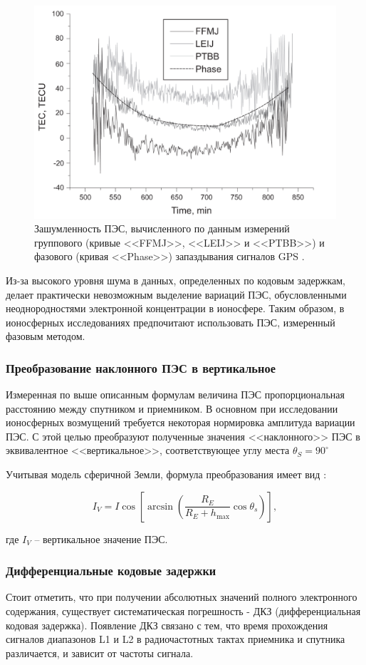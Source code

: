 \documentclass[14pt]{article}
\begin{document}
\begin{figure}[h]
\centering
\includegraphics[width = 0.6\linewidth]{pics/pic2.png}
\caption{Зашумленность ПЭС, вычисленного по данным измерений группового (кривые <<FFMJ>>, <<LEIJ>> и <<PTBB>>) и фазового (кривая <<Phase>>) запаздывания сигналов GPS \cite{kozharin}.}
\label{pic2}
\end{figure}

Из-за высокого уровня шума в данных, определенных по кодовым задержкам, делает практически невозможным выделение вариаций ПЭС, обусловленными неоднородностями электронной концентрации в ионосфере. Таким образом, в ионосферных исследованиях предпочитают использовать ПЭС, измеренный фазовым методом. 

\subsubsection{Преобразование наклонного ПЭС  в вертикальное}
Измеренная по выше описанным формулам величина ПЭС пропорциональная расстоянию между спутником и приемником. В основном при исследовании ионосферных возмущений требуется некоторая нормировка амплитуда вариации ПЭС. С этой целью преобразуют полученные значения <<наклонного>> ПЭС в эквивалентное <<вертикальное>>, соответствующее углу места $\theta_S = 90^{\circ}$ 

Учитывая модель сферичной Земли, формула преобразования имеет вид \cite{klobuchar}:

\begin{equation}
I_V = I \cos{\left[ \arcsin{\left( \frac{R_E}{R_E + h_\text{max}} \cos{\theta_s}\right)} \right]},
\label{sfuntion}
\end{equation} 

где $I_V$ -- вертикальное значение ПЭС. 

\subsubsection{Дифференциальные кодовые задержки}
Стоит отметить, что при получении абсолютных значений полного электронного содержания, существует систематическая погрешность - ДКЗ (дифференциальная кодовая задержка). Появление ДКЗ связано с тем, что время прохождения сигналов диапазонов L1 и L2 в радиочастотных тактах приемника и спутника различается, и зависит от частоты сигнала.
\end{document}
